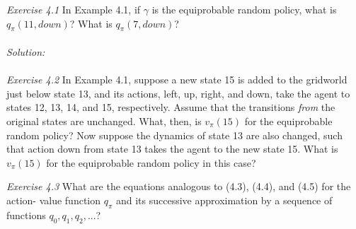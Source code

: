 \documentclass{article}
\begin{document}
\textit{Exercise 4.1} In Example 4.1, if $\gamma$ is the equiprobable random policy, what is $q_{\pi}(11, down)$? What is $q_{\pi}(7, down)$? \\
\\
\textit{Solution:} \\
\\

\textit{Exercise 4.2} In Example 4.1, suppose a new state 15 is added to the gridworld just below state 13, and its actions, left, up, right, and down, take the agent to states 12, 13, 14, and 15, respectively. Assume that the transitions \textit{from} the original states are unchanged. What, then, is $v_{\pi}(15)$ for the equiprobable random policy? Now suppose the dynamics of state 13 are also changed, such that action down from state 13 takes the agent to the new state 15. What is $v_{\pi}(15)$ for the equiprobable random policy in this case?

\textit{Exercise 4.3} What are the equations analogous to (4.3), (4.4), and (4.5) for the action- value function $q_{\pi}$ and its successive approximation by a sequence of functions $q_{0}, q_{1} , q_{2}, ...$?
\end{document}
